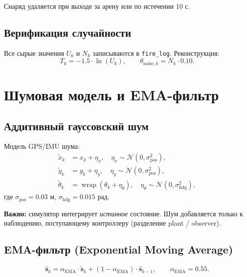 \documentclass[12pt, a4paper]{article}
\newcommand{\wrap}{\operatorname{wrap}}
\theoremstyle{definition}
\theoremstyle{plain}
\begin{document}
Снаряд удаляется при выходе за арену или по истечении 10 с.

\subsection{Верификация случайности}

Все сырые значения $U_k$ и $N_k$ записываются в \texttt{fire\_log}.
Реконструкция:
\[
  T_k = -1.5 \cdot \ln(U_k), \qquad
  \theta_{\text{noise},k} = N_k \cdot 0.10.
\]

\section{Шумовая модель и EMA-фильтр}\label{sec:noise}

\subsection{Аддитивный гауссовский шум}

Модель GPS/IMU шума:
\begin{align}
  \tilde{x}_k &= x_k + \eta_x, \quad \eta_x \sim \mathcal{N}(0, \sigma_{\text{pos}}^2), \nonumber\\
  \tilde{y}_k &= y_k + \eta_y, \quad \eta_y \sim \mathcal{N}(0, \sigma_{\text{pos}}^2), \\
  \tilde{\theta}_k &= \wrap(\theta_k + \eta_\theta), \quad \eta_\theta \sim \mathcal{N}(0, \sigma_{\text{hdg}}^2), \nonumber
\end{align}
где $\sigma_{\text{pos}} = 0.03$ м, $\sigma_{\text{hdg}} = 0.015$ рад.

\textbf{Важно:} симулятор интегрирует \emph{истинное} состояние.  Шум добавляется
только к наблюдению, поступающему контроллеру (разделение plant / observer).

\subsection{EMA-фильтр (Exponential Moving Average)}

\begin{equation}\label{eq:ema}
  \hat{\mathbf{s}}_k = \alpha_{\text{EMA}} \cdot \tilde{\mathbf{s}}_k
                     + (1 - \alpha_{\text{EMA}}) \cdot \hat{\mathbf{s}}_{k-1},
  \qquad \alpha_{\text{EMA}} = 0.55.
\end{equation}
\end{document}
